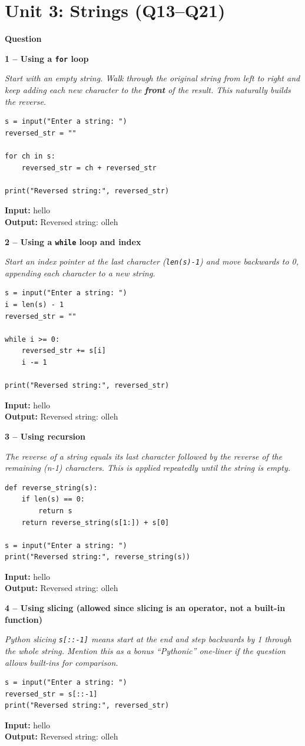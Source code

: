 \documentclass[12pt]{article}
\newenvironment{qbox}[1]{\par\bigskip\noindent\textbf{#1}\par}{\par\medskip}
\newcommand{\1}{Question}
\newcommand{\method}[1]{\par\medskip\noindent\textbf{#1}\par}
\newcommand{\logicbox}[1]{\par\smallskip\noindent\textit{#1}\par}
\newcommand{\inout}[2]{\par\smallskip\noindent\textbf{Input:} #1\\\textbf{Output:} #2\par}
\begin{document}
\section{Unit 3: Strings (Q13--Q21)}

\begin{qbox}{\1}

\method{1 -- Using a \texttt{for} loop}
\logicbox{Start with an empty string. Walk through the original string from left to right and keep adding each new character to the \textbf{front} of the result. This naturally builds the reverse.}
\begin{lstlisting}
s = input("Enter a string: ")
reversed_str = ""

for ch in s:
    reversed_str = ch + reversed_str

print("Reversed string:", reversed_str)
\end{lstlisting}
\inout{hello}{Reversed string: olleh}

\method{2 -- Using a \texttt{while} loop and index}
\logicbox{Start an index pointer at the last character (\texttt{len(s)-1}) and move backwards to 0, appending each character to a new string.}
\begin{lstlisting}
s = input("Enter a string: ")
i = len(s) - 1
reversed_str = ""

while i >= 0:
    reversed_str += s[i]
    i -= 1

print("Reversed string:", reversed_str)
\end{lstlisting}
\inout{hello}{Reversed string: olleh}

\method{3 -- Using recursion}
\logicbox{The reverse of a string equals its last character followed by the reverse of the remaining (n-1) characters. This is applied repeatedly until the string is empty.}
\begin{lstlisting}
def reverse_string(s):
    if len(s) == 0:
        return s
    return reverse_string(s[1:]) + s[0]

s = input("Enter a string: ")
print("Reversed string:", reverse_string(s))
\end{lstlisting}
\inout{hello}{Reversed string: olleh}

\method{4 -- Using slicing (allowed since slicing is an operator, not a built-in function)}
\logicbox{Python slicing \texttt{s[::-1]} means start at the end and step backwards by 1 through the whole string. Mention this as a bonus ``Pythonic'' one-liner if the question allows built-ins for comparison.}
\begin{lstlisting}
s = input("Enter a string: ")
reversed_str = s[::-1]
print("Reversed string:", reversed_str)
\end{lstlisting}
\inout{hello}{Reversed string: olleh}
\end{qbox}
\end{document}
